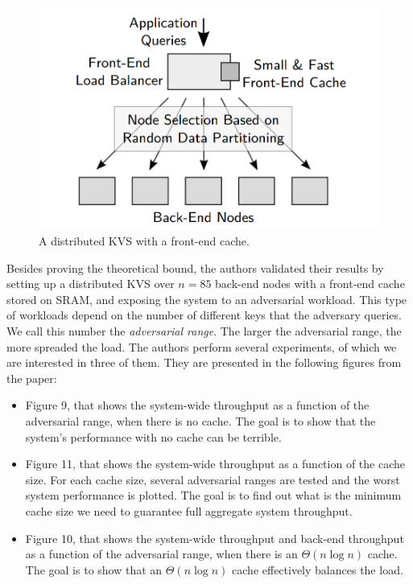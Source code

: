 \documentclass[10pt,letterpaper]{article}
\begin{document}
\begin{figure}
\begin{center}	
	\includegraphics[scale=0.25]{kvs.png}
		\caption{A distributed KVS with a front-end cache.}
\end{center}
\end{figure}

Besides proving the theoretical bound, the authors validated their results by setting up a distributed KVS over $n = 85$ back-end nodes with a front-end cache stored on SRAM, and exposing the system to an adversarial workload. This type of workloads depend on the number of different keys that the adversary queries. We call this number the \textit{adversarial range}. The larger the adversarial range, the more spreaded the load. The authors perform several experiments, of which we are interested in three of them. They are presented in the following figures from the paper:

\begin{itemize}
	\item Figure 9, that shows the system-wide throughput as a function of the adversarial range, when there is no cache. The goal is to show that the system's performance with no cache can be terrible.
	\item Figure 11, that shows the system-wide throughput as a function of the cache size. For each cache size, several adversarial ranges are tested and the worst system performance is plotted. The goal is to find out what is the minimum cache size we need to guarantee full aggregate system throughput.
	\item Figure 10, that shows the system-wide throughput and back-end throughput as a function of the adversarial range, when there is an $\Theta(n \log n)$ cache. The goal is to show that an $\Theta(n \log n)$ cache effectively balances the load.
\end{itemize}
\end{document}
